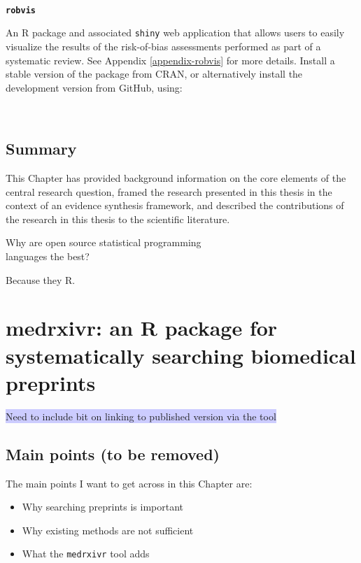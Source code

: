 \documentclass[a4paper, twoside]{templates/ociamthesis}
\begin{document}
~

\textbf{\texttt{robvis}}

An R package and associated \texttt{shiny} web application that allows users to easily visualize the results of the risk-of-bias assessments performed as part of a systematic review. See Appendix \ref{appendix-robvis} for more details. Install a stable version of the package from CRAN, or alternatively install the development version from GitHub, using:

~

\hypertarget{summary}{%
\section{Summary}\label{summary}}

This Chapter has provided background information on the core elements of the central research question, framed the research presented in this thesis in the context of an evidence synthesis framework, and described the contributions of the research in this thesis to the scientific literature.

\begin{savequote}
Why are open source statistical programming\\
languages the best?

Because they R.
\end{savequote}



\hypertarget{sys-rev-tools-heading}{%
\chapter{medrxivr: an R package for systematically searching biomedical preprints}\label{sys-rev-tools-heading}}

\minitoc 

\colorbox[HTML]{CCCCFF}{Need to include bit on linking to published version via the tool}

\hypertarget{main-points-to-be-removed}{%
\section{Main points (to be removed)}\label{main-points-to-be-removed}}

The main points I want to get across in this Chapter are:

\begin{itemize}
\item
  Why searching preprints is important
\item
  Why existing methods are not sufficient
\item
  What the \texttt{medrxivr} tool adds
\end{itemize}
\end{document}
